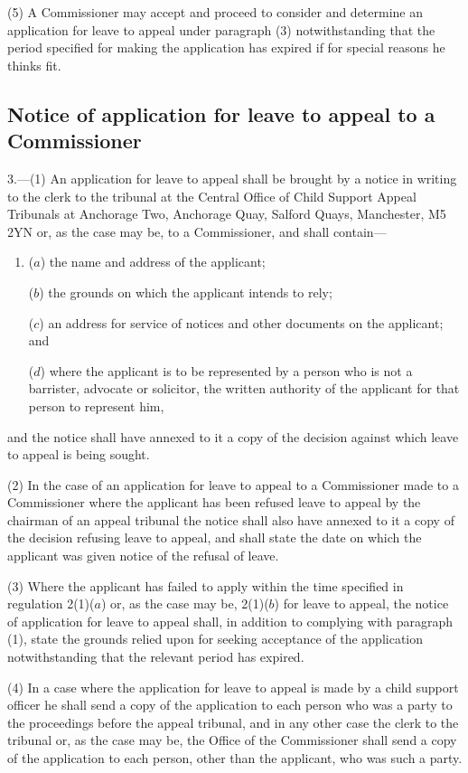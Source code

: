 \documentclass[a4paper]{article}
\begin{document}
(5) A Commissioner may accept and proceed to consider and determine an application for leave to appeal under paragraph (3) notwithstanding that the period specified for making the application has expired if for special reasons he thinks fit.

\subsection[3. Notice of application for leave to appeal to a Commissioner]{Notice of application for leave to appeal to a Commissioner}

3.—(1) An application for leave to appeal shall be brought by a notice in writing to the clerk to the tribunal at the Central Office of Child Support Appeal Tribunals at Anchorage Two, Anchorage Quay, Salford Quays, Manchester, M5 2YN or, as the case may be, to a Commissioner, and shall contain—
\begin{enumerate}\item[]
($a$) the name and address of the applicant;

($b$) the grounds on which the applicant intends to rely;

($c$) an address for service of notices and other documents on the applicant; and

($d$) where the applicant is to be represented by a person who is not a barrister, advocate or solicitor, the written authority of the applicant for that person to represent him,
\end{enumerate}
and the notice shall have annexed to it a copy of the decision against which leave to appeal is being sought.

(2) In the case of an application for leave to appeal to a Commissioner made to a Commissioner where the applicant has been refused leave to appeal by the chairman of an appeal tribunal the notice shall also have annexed to it a copy of the decision refusing leave to appeal, and shall state the date on which the applicant was given notice of the refusal of leave.

(3) Where the applicant has failed to apply within the time specified in regulation 2(1)($a$) or, as the case may be, 2(1)($b$) for leave to appeal, the notice of application for leave to appeal shall, in addition to complying with paragraph (1), state the grounds relied upon for seeking acceptance of the application notwithstanding that the relevant period has expired.

(4) In a case where the application for leave to appeal is made by a child support officer he shall send a copy of the application to each person who was a party to the proceedings before the appeal tribunal, and in any other case the clerk to the tribunal or, as the case may be, the Office of the Commissioner shall send a copy of the application to each person, other than the applicant, who was such a party.
\end{document}
